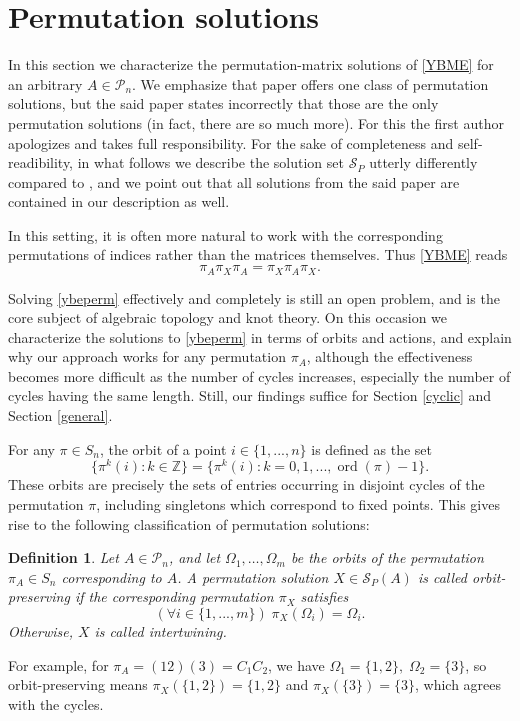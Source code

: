 \documentclass{article}
\newtheorem{definition}{Definition}[section]
\theoremstyle{definition}\newtheorem{example}{Example}[section]
\def\S{{\mathcal{S}}}
\def\P{{\mathcal{P}}}
\begin{document}
	\section{Permutation solutions}\label{Perm}
			
	In this section we characterize the permutation-matrix solutions of \eqref{YBME} for an arbitrary $A\in \P_n$. We emphasize that paper \cite{BDD} offers one class of permutation solutions, but the said paper states incorrectly that those are the only permutation solutions (in fact, there are so much more). For this the first author apologizes and takes full responsibility. For the sake of completeness and self-readibility, in what follows we describe the solution set $\S_P$ utterly differently compared to \cite{BDD}, and we point out that all solutions from the said paper are contained in our description as well.
	
	In this setting, it is often more natural to work with the corresponding permutations of indices rather than the matrices themselves. Thus \eqref{YBME} reads
	\begin{equation}
		\label{ybeperm} \pi_A\pi_X\pi_A=\pi_X\pi_A\pi_X.
	\end{equation}
	
Solving \eqref{ybeperm} effectively and completely is still an open problem, and is the core subject of algebraic topology and knot theory. On this occasion we characterize the solutions to \eqref{ybeperm} in terms of orbits and actions, and explain why our approach works for any permutation $\pi_A$, although the effectiveness becomes more difficult as the number of cycles increases, especially the number of cycles having the same length. Still, our findings suffice for Section \ref{cyclic} and Section \ref{general}.


	For any $\pi\in S_n$, the orbit of a point $i\in\{1,...,n\}$ is defined as the set 
	$$\{\pi^k(i): k\in\mathbb{Z}\}=\{\pi^k(i): k=0,1,...,\operatorname{ord}(\pi)-1\}.$$ 
	These orbits are precisely the sets of entries occurring in disjoint cycles of the permutation $\pi$, including singletons which correspond to fixed points. This gives rise to the following classification of permutation solutions: 
		\begin{definition}
		Let $A\in\P_n$, and let $\Omega_1,\ldots,\Omega_m$ be the orbits of the
		permutation $\pi_A\in S_n$ corresponding to $A$. A permutation solution
		$X\in\mathcal S_P(A)$ is called orbit-preserving if the corresponding
		permutation $\pi_X$ satisfies
		$$
		(\forall i\in\{1,...,m\})\;\pi_X(\Omega_i)=\Omega_i.
		$$
		Otherwise, $X$ is called intertwining.
	\end{definition}
	For example, for $\pi_A=(12)(3)=C_1C_2$, we have $\Omega_1=\{1,2\},\;\Omega_2=\{3\}$, so orbit-preserving means $\pi_X(\{1,2\})=\{1,2\}$ and $\pi_X(\{3\})=\{3\}$, which agrees with the cycles. 
	
\end{document}
